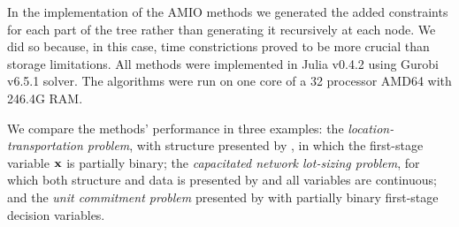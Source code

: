 \documentclass[12pt,x11names]{article}
\theoremstyle{definition}
\newcommand{\bx}{{\bf x}}
\begin{document}
In the implementation of the AMIO methods we generated the added constraints for each part of the tree rather than generating it recursively at each node. We did so because, in this case, time constrictions proved to be more crucial than storage limitations. All methods were implemented in Julia v0.4.2 using Gurobi v6.5.1 solver. The algorithms were run on one core of a 32 processor AMD64 with 246.4G RAM.

We compare the methods' performance in three examples: the \emph{location-transportation problem}, with structure presented by \citet{AtamturkZhang2007}, in which the first-stage variable $\bx$ is partially binary; the \emph{capacitated network lot-sizing problem}, for which both structure and data is presented by \citet{Bertsimas2015} and all variables are continuous; and the \emph{unit commitment problem} presented by \citet{Bertsimas2013} with partially binary first-stage decision variables. 
\end{document}
